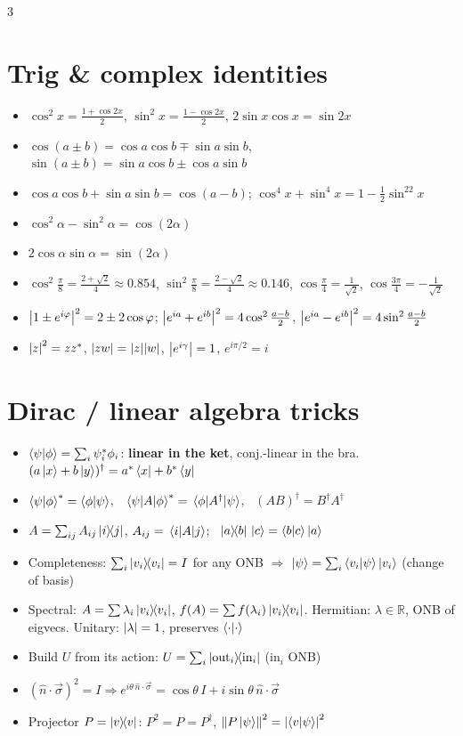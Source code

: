 \documentclass[10pt]{article}
\begin{document}
\begin{multicols*}{3}
\section{Trig \& complex identities}
\begin{itemize}
  \item $\cos^2x=\tfrac{1+\cos2x}2$, $\sin^2x=\tfrac{1-\cos2x}2$, $2\sin x\cos x=\sin2x$
  \item $\cos(a\pm b)=\cos a\cos b\mp\sin a\sin b$, $\sin(a\pm b)=\sin a\cos b\pm\cos a\sin b$
  \item $\cos a\cos b+\sin a\sin b=\cos(a-b)$; $\cos^4x+\sin^4x=1-\tfrac12\sin^22x$
  \item $\cos^2 \alpha - \sin^2 \alpha = \cos\left(2 \alpha\right)$
  \item $2 \cos \alpha \sin \alpha =  \sin\left(2\alpha\right)$
  \item $\cos^2\tfrac\pi8=\tfrac{2+\sqrt2}4\approx0.854$, $\sin^2\tfrac\pi8=\tfrac{2-\sqrt2}4\approx0.146$, $\cos\tfrac\pi4=\tfrac1{\sqrt2}$, $\cos\tfrac{3\pi}4=-\tfrac1{\sqrt2}$
  \item $\abs{1\pm e^{i\varphi}}^2=2\pm2\cos\varphi$; $\abs{e^{ia}+e^{ib}}^2=4\cos^2\tfrac{a-b}2$, $\abs{e^{ia}-e^{ib}}^2=4\sin^2\tfrac{a-b}2$
  \item $\abs{z}^2=zz^*$, $\abs{zw}=\abs{z}\abs{w}$, $\abs{e^{i\gamma}}=1$, $e^{i\pi/2}=i$
\end{itemize}


\section{Dirac / linear algebra tricks}
\begin{itemize}
  \item $\braket{\psi}{\phi}=\sum_i\psi_i^*\phi_i$: \textbf{linear in the ket}, conj.-linear in the bra. $(a\ket{x}+b\ket{y})^\dagger=a^*\bra{x}+b^*\bra{y}$
  \item $\braket{\psi}{\phi}^*=\braket{\phi}{\psi}$, \ $\mel{\psi}{A}{\phi}^*=\mel{\phi}{A^\dagger}{\psi}$, \ $(AB)^\dagger=B^\dagger A^\dagger$
  \item $A=\sum_{ij}A_{ij}\dyad{i}{j}$, $A_{ij}=\mel{i}{A}{j}$; \ $\dyad{a}{b}\,\ket{c}=\braket{b}{c}\ket{a}$
  \item Completeness: $\sum_i\dyad{v_i}=I$ for any ONB $\Rightarrow$ $\ket{\psi}=\sum_i\braket{v_i}{\psi}\ket{v_i}$ (change of basis)
  \item Spectral: $A=\sum\lambda_i\dyad{v_i}$, $f(A)=\sum f(\lambda_i)\dyad{v_i}$. Hermitian: $\lambda\in\mathbb R$, ONB of eigvecs. Unitary: $\abs{\lambda}=1$, preserves $\braket{\cdot}{\cdot}$
  \item Build $U$ from its action: $U=\sum_i \dyad{\text{out}_i}{\text{in}_i}$ (in$_i$ ONB)
  \item $(\hat n\cdot\vec\sigma)^2=I\Rightarrow e^{i\theta\,\hat n\cdot\vec\sigma}=\cos\theta\,I+i\sin\theta\,\hat n\cdot\vec\sigma$
  \item Projector $P=\dyad{v}$: $P^2=P=P^\dagger$, $\norm{P\ket\psi}^2=\abs{\braket{v}{\psi}}^2$
\end{itemize}


\end{multicols*}
\end{document}
